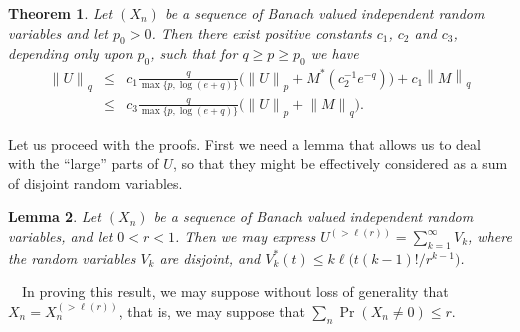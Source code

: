\documentclass[12pt]{article}
\newtheorem{thm}{Theorem}[section]
\newtheorem{lemma}[thm]{Lemma}
\newcommand{\normo}[1]{{\left\|#1\right\|}}
\newcommand{\snormo}[1]{{\mathopen\|#1\mathclose\|}}
\newcommand{\Proof}{\medskip\noindent{\bf Proof:}\ \ }
\begin{document}
\begin{thm}
Let $(X_n)$ be a sequence of Banach valued independent random
variables and let $p_0 > 0$. Then there exist positive constants
$c_1$, $c_2$ 
and $c_3$, depending only upon $p_0$, such that for $q \ge p \ge p_0$
we 
have 
\begin{eqnarray*}
  \snormo U_q
  &\le& c_1 {\frac{q }{ \max\{p,\log(e+q)\}}}
        \bigl(\snormo U_p + M^*(c_2^{-1} e^{-q}) \bigr) + 
        c_1 \normo M_q \\
  &\le& c_3 {\frac{q }{ \max\{p,\log(e+q)\}}}
        \bigl(\snormo U_p + \snormo M_q \bigr). 
\end{eqnarray*}
\end{thm}

Let us proceed with the proofs.  First we need a lemma that allows 
us to deal with the ``large'' parts of $U$, so that they might be 
effectively considered as a sum of disjoint random variables.

\begin{lemma}
\label{disjoint}
Let $(X_n)$ be a sequence of Banach valued independent random 
variables, and let $0<r<1$.  Then we may express $ U^{(>\ell(r))} = 
\sum_{k=1}^\infty V_k $, where the random variables $V_k$ are
disjoint, and $ V_k^*(t) \le k \ell\bigl(t(k-1)!/r^{k-1}\bigr) $.
\end{lemma}

\Proof  In proving this result, we may suppose without loss of
generality that $X_n = X_n^{(>\ell(r))}$, that is, we may suppose that
$\sum_n\Pr(X_n \ne 0) \le r$.
\end{document}
